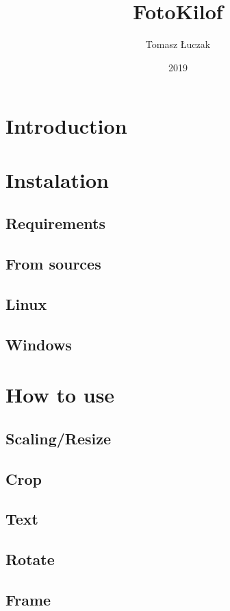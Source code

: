 \documentclass[oneside,11pt]{article}
\author{Tomasz Łuczak}
\title{FotoKilof}
\date{2019}
\begin{document}
\maketitle

\tableofcontents

\section{Introduction}

\section{Instalation}
\subsection{Requirements}

\subsection{From sources}

\subsection{Linux}

\subsection{Windows}

\section{How to use}
\subsection{Scaling/Resize}
\subsection{Crop}
\subsection{Text}
\subsection{Rotate}
\subsection{Frame}
\end{document}
